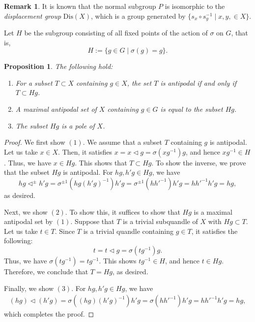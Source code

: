 \documentclass[dvipdfmx,12pt]{amsart}
\theoremstyle{plain}
\newtheorem{prop}[thm]{Proposition}
\theoremstyle{definition}
\newtheorem{rmk}[thm]{Remark}
\newcommand{\qop}{\triangleleft}
\begin{document}
\begin{rmk}
  It is known that the normal subgroup $P$ is isomorphic to the \emph{displacement group} $\mathrm{Dis}(X)$, which is a group generated by $\{s_x \circ s_y^{-1} \mid x,y, \in X\}$.
\end{rmk}

Let $H$ be the subgroup consisting of all fixed points of the action of $\sigma$ on $G$, that is, 
\[
  H := \{g \in G \mid \sigma(g) = g\}.
\]
\begin{prop}\label{prop:max_anti_GAlex}
  The following hold:
  \begin{enumerate}
    \item[$(1)$] For a subset $T \subset X$ containing $g \in X$,
    the set $T$ is antipodal if and only if $T \subset Hg$.

    \item[$(2)$] A maximal antipodal set of $X$ containing $g \in G$ is equal to the subset $Hg$.

    \item[$(3)$] The subset $Hg$ is a pole of $X$.
  \end{enumerate}
\end{prop}
\begin{proof}
  We first show $(1)$.
  We assume that a subset $T$ containing $g$ is antipodal.
  Let us take $x \in X$.
  Then, it satisfies $x = x \qop g = \sigma(x g^{-1}) g$,
  and hence $xg^{-1} \in H$.
  Thus, we have $x \in Hg$.
  This shows that $T \subset Hg$.
  To show the inverse, we prove that the subset $Hg$ is antipodal.
  For $hg, h'g \in H g$, we have
  \[
    hg \qop^{\pm} h'g = \sigma^{\pm 1}(hg(h'g)^{-1}) h'g = \sigma^{\pm 1}(h h'^{-1})h'g = h h'^{-1}h'g = hg,
  \]
  as desired.

  Next, we show $(2)$.
  To show this, it suffices to show that $Hg$ is a maximal antipodal set by $(1)$.
  Suppose that $T$ is a trivial subquandle of $X$ with $Hg \subset T$.
  Let us take $t \in T$.
  Since $T$ is a trivial quandle containing $g \in T$, it satisfies the following:
  \[
    t = t \qop g = \sigma(tg^{-1})g.
  \]
  Thus, we have $\sigma(tg^{-1}) = tg^{-1}$.
  This shows $tg^{-1} \in H$, and hence $t \in Hg$.
  Therefore, we conclude that $T = Hg$, as desired.

  Finally, we show $(3)$.
  For $hg, h'g \in Hg$, we have
  \begin{align*}
      (hg) \qop (h'g) = \sigma((hg)(h'g)^{-1})h'g = \sigma(hh'^{-1})h'g = hh'^{-1}h'g = hg,
  \end{align*}
  which completes the proof.
\end{proof}
\end{document}
